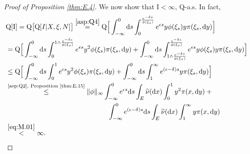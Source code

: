 \documentclass[12pt,a4paper]{amsart}
\numberwithin{equation}{section}
\theoremstyle{plain}
\theoremstyle{definition}
\theoremstyle{remark}
\begin{document}
\begin{proof}[Proof of Proposition \ref{thm:E.4}]
We now show that $\text{I} < \infty$, $\mathrm Q$-a.s.
	In fact,
\begin{align}
	&\mathrm Q[\text{I}]
	= \mathrm Q\big[\mathrm Q[I|X,\xi,N]\big]
	\overset{\eqref{asp:Q4}}=\mathrm Q\Big[\int_{-\infty}^0 \mathrm ds \int_0^{\frac{e^{-\delta s}}{\phi(\xi_s)}} e^{\epsilon s}y\phi(\xi_s) y \pi(\xi_s, \mathrm dy)\Big]
	\\&=\mathrm Q \Big[ \int_{-\infty}^0 \mathrm ds \int_0^{1\wedge \frac{e^{-\delta s}}{\phi(\xi_s)}} e^{\epsilon s} y^2 \phi(\xi_s)\pi(\xi_s, \mathrm dy) + \int_{-\infty}^0 \mathrm ds \int_{1\wedge \frac{e^{-\delta s}}{\phi(\xi_s)}}^{\frac{e^{-\delta s}}{\phi(\xi_s)}} e^{\epsilon s}y\phi(\xi_s) y \pi(\xi_s, \mathrm dy)\Big]
	\\&\leq \mathrm Q \Big[ \int_{-\infty}^0 \mathrm ds \int_0^1 e^{\epsilon s} y^2 \phi(\xi_s)\pi(\xi_s, \mathrm dy) + \int_{-\infty}^0 \mathrm ds \int_{1}^{\infty} e^{(\epsilon-\delta) s} y \pi(\xi_s, \mathrm dy)\Big]
	\\&\begin{multlined}
		\overset{\text{\eqref{asp:Q2}, Proposition \ref{thm:E.15}}}\leq \|\phi\|_\infty\int_{-\infty}^0  e^{\epsilon s}\mathrm ds \int_E \widetilde \nu(\mathrm dx)\int_0^1y^2 \pi(x, \mathrm dy) + {}
		\\ \int_{-\infty}^0  e^{(\epsilon-\delta )s}\mathrm ds\int_E \widetilde \nu(\mathrm dx)\int_1^{\infty}y \pi(x, \mathrm dy)
	\end{multlined}
	\\&\overset{\eqref{eq:M.01}}<\infty.
\end{align}
	

\end{proof}
\end{document}
